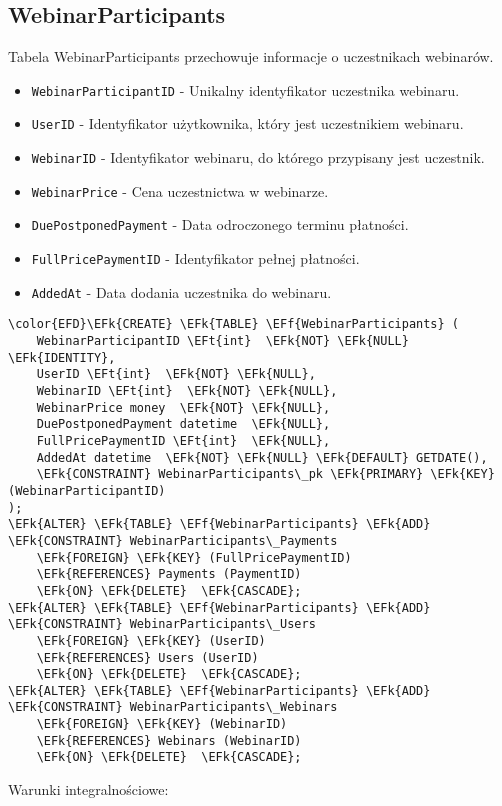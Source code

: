 \documentclass[11pt]{article}
\newcommand{\EFk}[1]{\textcolor{EFk}{\textbf{#1}}} %
\newcommand{\EFf}[1]{\textcolor{EFf}{#1}} %
\newcommand{\EFt}[1]{\textcolor{EFt}{\textbf{#1}}} %
\begin{document}
\subsection{WebinarParticipants}
\label{sec:orgf6b6fb3}
Tabela WebinarParticipants przechowuje informacje o uczestnikach webinarów.
\begin{itemize}
\item \texttt{WebinarParticipantID} - Unikalny identyfikator uczestnika webinaru.
\item \texttt{UserID} - Identyfikator użytkownika, który jest uczestnikiem webinaru.
\item \texttt{WebinarID} - Identyfikator webinaru, do którego przypisany jest uczestnik.
\item \texttt{WebinarPrice} - Cena uczestnictwa w webinarze.
\item \texttt{DuePostponedPayment} - Data odroczonego terminu płatności.
\item \texttt{FullPricePaymentID} - Identyfikator pełnej płatności.
\item \texttt{AddedAt} - Data dodania uczestnika do webinaru.
\end{itemize}
\begin{Code}
\begin{Verbatim}
\color{EFD}\EFk{CREATE} \EFk{TABLE} \EFf{WebinarParticipants} (
    WebinarParticipantID \EFt{int}  \EFk{NOT} \EFk{NULL} \EFk{IDENTITY},
    UserID \EFt{int}  \EFk{NOT} \EFk{NULL},
    WebinarID \EFt{int}  \EFk{NOT} \EFk{NULL},
    WebinarPrice money  \EFk{NOT} \EFk{NULL},
    DuePostponedPayment datetime  \EFk{NULL},
    FullPricePaymentID \EFt{int}  \EFk{NULL},
    AddedAt datetime  \EFk{NOT} \EFk{NULL} \EFk{DEFAULT} GETDATE(),
    \EFk{CONSTRAINT} WebinarParticipants\_pk \EFk{PRIMARY} \EFk{KEY}  (WebinarParticipantID)
);
\EFk{ALTER} \EFk{TABLE} \EFf{WebinarParticipants} \EFk{ADD} \EFk{CONSTRAINT} WebinarParticipants\_Payments
    \EFk{FOREIGN} \EFk{KEY} (FullPricePaymentID)
    \EFk{REFERENCES} Payments (PaymentID)
    \EFk{ON} \EFk{DELETE}  \EFk{CASCADE};
\EFk{ALTER} \EFk{TABLE} \EFf{WebinarParticipants} \EFk{ADD} \EFk{CONSTRAINT} WebinarParticipants\_Users
    \EFk{FOREIGN} \EFk{KEY} (UserID)
    \EFk{REFERENCES} Users (UserID)
    \EFk{ON} \EFk{DELETE}  \EFk{CASCADE};
\EFk{ALTER} \EFk{TABLE} \EFf{WebinarParticipants} \EFk{ADD} \EFk{CONSTRAINT} WebinarParticipants\_Webinars
    \EFk{FOREIGN} \EFk{KEY} (WebinarID)
    \EFk{REFERENCES} Webinars (WebinarID)
    \EFk{ON} \EFk{DELETE}  \EFk{CASCADE};
\end{Verbatim}
\end{Code}
Warunki integralnościowe:
\end{document}
